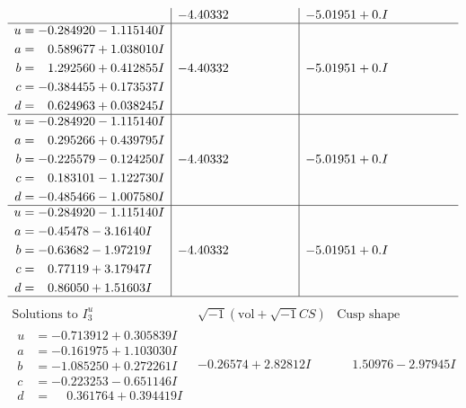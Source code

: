 \documentclass[1p]{elsarticle_modified}
\theoremstyle{definition}
\newcommand{\I}{\sqrt{-1}}
\begin{document}
$$\begin{array}{c|c|c}
 & -4.40332\phantom{ +0.000000I} & -5.01951 + 0. I\phantom{ +0.000000I} \\ \hline\begin{aligned}
u &= -0.284920 - 1.115140 I \\
a &= \phantom{-}0.589677 + 1.038010 I \\
b &= \phantom{-}1.292560 + 0.412855 I \\
c &= -0.384455 + 0.173537 I \\
d &= \phantom{-}0.624963 + 0.038245 I\end{aligned}
 & -4.40332\phantom{ +0.000000I} & -5.01951 + 0. I\phantom{ +0.000000I} \\ \hline\begin{aligned}
u &= -0.284920 - 1.115140 I \\
a &= \phantom{-}0.295266 + 0.439795 I \\
b &= -0.225579 - 0.124250 I \\
c &= \phantom{-}0.183101 - 1.122730 I \\
d &= -0.485466 - 1.007580 I\end{aligned}
 & -4.40332\phantom{ +0.000000I} & -5.01951 + 0. I\phantom{ +0.000000I} \\ \hline\begin{aligned}
u &= -0.284920 - 1.115140 I \\
a &= -0.45478 - 3.16140 I \\
b &= -0.63682 - 1.97219 I \\
c &= \phantom{-}0.77119 + 3.17947 I \\
d &= \phantom{-}0.86050 + 1.51603 I\end{aligned}
 & -4.40332\phantom{ +0.000000I} & -5.01951 + 0. I\phantom{ +0.000000I}\\
 \hline 
 \end{array}$$\newpage$$\begin{array}{c|c|c}  
\text{Solutions to }I^u_{3}& \I (\text{vol} + \sqrt{-1}CS) & \text{Cusp shape}\\
 \hline 
\begin{aligned}
u &= -0.713912 + 0.305839 I \\
a &= -0.161975 + 1.103030 I \\
b &= -1.085250 + 0.272261 I \\
c &= -0.223253 - 0.651146 I \\
d &= \phantom{-}0.361764 + 0.394419 I\end{aligned}
 & -0.26574 + 2.82812 I & \phantom{-}1.50976 - 2.97945 I \\ \hline\begin{aligned}

\end{aligned}
\end{array}$$
\end{document}
